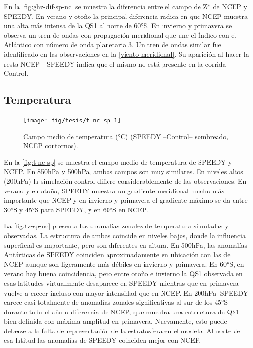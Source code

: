 \documentclass[spanish,a4paper,12pt,oneside]{book}
\begin{document}
En la \autoref{fig:ghz-dif-sp-nc} se muestra la diferencia entre el
campo de Z* de NCEP y SPEEDY. En verano y otoño la principal diferencia
radica en que NCEP muestra una alta más intensa de la QS1 al norte de
60°S. En invierno y primavera se observa un tren de ondas con
propagación meridional que une el Índico con el Atlántico con número de
onda planetaria 3. Un tren de ondas similar fue identificado en las
observaciones en la \autoref{viento-meridional}. Su aparición al hacer
la resta NCEP - SPEEDY indica que el mismo no está presente en la
corrida Control.

\hypertarget{temperatura-1}{%
\subsection{Temperatura}\label{temperatura-1}}

\begin{landscape}\begin{figure}

{\centering \texttt{[image: fig/tesis/t-nc-sp-1]} 

}

\caption{Campo medio de temperatura (°C) (SPEEDY --Control-- sombreado, NCEP contornos).}\label{fig:t-nc-sp}
\end{figure}
\end{landscape}

En la \autoref{fig:t-nc-sp} se muestra el campo medio de temperatura de
SPEEDY y NCEP. En 850hPa y 500hPa, ambos campos son muy similares. En
niveles altos (200hPa) la simulación control difiere considerablemente
de las observaciones. En verano y en otoño, SPEEDY muestra un gradiente
meridional mucho más importante que NCEP y en invierno y primavera el
gradiente máximo se da entre 30°S y 45°S para SPEEDY, y en 60°S en NCEP.

La \autoref{fig:tz-sp-nc} presenta las anomalías zonales de temperatura
simuladas y observadas. La estructura de ambas coincide en niveles
bajos, donde la influencia superficial es importante, pero son
diferentes en altura. En 500hPa, las anomalías Antárticas de SPEEDY
coinciden aproximadamente en ubicación con las de NCEP aunque son
ligeramente más débiles en invierno y primavera. En 60°S, en verano hay
buena coincidencia, pero entre otoño e invierno la QS1 observada en esas
latitudes virtualmente desaparece en SPEEDY mientras que en primavera
vuelve a crecer incluso con mayor intensidad que en NCEP. En 200hPa,
SPEEDY carece casi totalmente de anomalías zonales significativas al sur
de los 45°S durante todo el año a diferencia de NCEP, que muestra una
estructura de QS1 bien definida con máxima amplitud en primavera.
Nuevamente, esto puede deberse a la falta de representación de la
estratosfera en el modelo. Al norte de esa latitud las anomalías de
SPEEDY coinciden mejor con NCEP.
\end{document}
